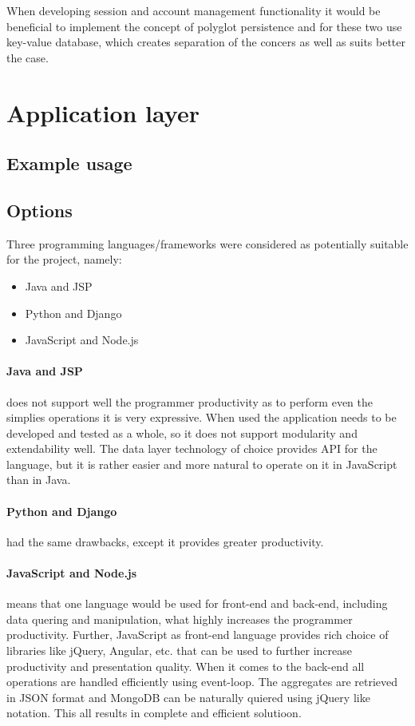 \documentclass[11pt, a4paper]{report}
\begin{document}
When developing session and account management functionality it would be beneficial to implement the concept of polyglot persistence and for these two use key-value database, which creates separation of the concers as well as suits better the case.


\section{Application layer}
\subsection{Example usage}

\subsection{Options}
Three programming languages/frameworks were considered as potentially suitable for the project, namely:
\begin{itemize}
  \item Java and JSP
  \item Python and Django
  \item JavaScript and Node.js
\end{itemize}

\paragraph{Java and JSP} does not support well the programmer productivity as to perform even the simplies operations it is very expressive. When used the application needs to be developed and tested as a whole, so it does not support modularity and extendability well. The data layer technology of choice provides API for the language, but it is rather easier and more natural to operate on it in JavaScript than in Java.

\paragraph{Python and Django} had the same drawbacks, except it provides greater productivity.

\paragraph{JavaScript and Node.js} means that one language would be used for front-end and back-end, including data quering and manipulation, what highly increases the programmer productivity. Further, JavaScript as front-end language provides rich choice of libraries like jQuery, Angular, etc. that can be used to further increase productivity and presentation quality. When it comes to the back-end all operations are handled efficiently using event-loop. The aggregates are retrieved in JSON format and MongoDB can be naturally quiered using jQuery like notation. This all results in complete and efficient solutioon.
\end{document}
